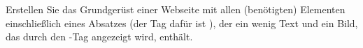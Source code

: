 %
\par Erstellen Sie das Grundgerüst einer Webseite mit allen (benötigten)
Elementen einschließlich eines Absatzes (der Tag dafür ist ), der ein
wenig Text und ein Bild, das durch den -Tag angezeigt wird, enthält.